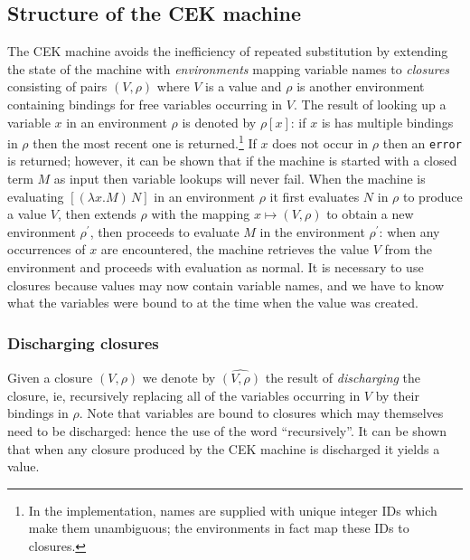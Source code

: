 \documentclass[a4paper]{article}
\newcommand\discharge[1]{\widehat{#1}}
\begin{document}
\begin{appendices}
\subsection{Structure of the CEK machine}
The CEK machine avoids the inefficiency of repeated substitution by
extending the state of the machine with
\textit{environments} mapping variable names to \textit{closures} consisting of
pairs $(V,\rho)$ where $V$ is a value and $\rho$ is another
environment containing bindings for free variables occurring in $V$.
The result of looking up a variable $x$ in an environment $\rho$ is
denoted by $\rho[x]$: if $x$ is has multiple bindings in $\rho$ then
the most recent one is returned.\footnote{In the implementation, names
are supplied with unique integer IDs which make them unambiguous; the
environments in fact map these IDs to closures.} If $x$ does not occur
in $\rho$ then an \texttt{error} is returned; however, it can be shown
that if the machine is started with a closed term $M$ as input then
variable lookups will never fail.  When the machine is evaluating
$[(\lambda x.M)\, N]$ in an environment $\rho$ it first evaluates $N$
in $\rho$ to produce a value $V$, then extends $\rho$ with the mapping
$x \mapsto (V,\rho)$ to obtain a new environment $\rho^{\prime}$, then
proceeds to evaluate $M$ in the environment $\rho^\prime$: when any
occurrences of $x$ are encountered, the machine retrieves the value
$V$ from the environment and proceeds with evaluation as normal.  It
is necessary to use closures because values may now contain variable
names, and we have to know what the variables were bound to at the
time when the value was created.

\subsubsection{Discharging closures}
Given a closure $(V,\rho)$ we denote by $\discharge{(V,\rho)}$ the
result of \textit{discharging} the closure, ie, recursively replacing
all of the variables occurring in $V$ by their bindings in
$\rho$. Note that variables are bound to closures which may themselves
need to be discharged: hence the use of the word ``recursively''. It
can be shown that when any closure produced by the CEK machine is
discharged it yields a value.


\end{appendices}
\end{document}
